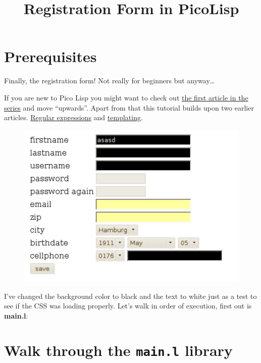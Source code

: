 \title{Registration Form in PicoLisp}

\maketitle

\section{Prerequisites}
\label{sec:registration-form}

Finally, the registration form! Not really for beginners but anyway…

If you are new to Pico Lisp you might want to check out
\href{http://www.prodevtips.com/2008/03/28/pico-lisp/}{the first article in the series} and move ``upwards''. Apart from that this tutorial builds
upon two earlier articles.
\href{http://www.prodevtips.com/2008/07/01/regular-expressions-in-pico-lisp/}{Regular expressions} and
\href{http://www.prodevtips.com/2008/07/17/templating-in-pico-lisp/}{templating}.

\begin{figure}[H]
  \centering
\includegraphics[scale=.6]{graphics/pico_reg_form.png}  
\end{figure}

I've changed the background color to black and the text to white just as
a test to see if the CSS was loading properly. Let's walk in order of
execution, first out is \textbf{main.l}:

\section{Walk through the \texttt{main.l} library}
\label{sec:registration-form}

